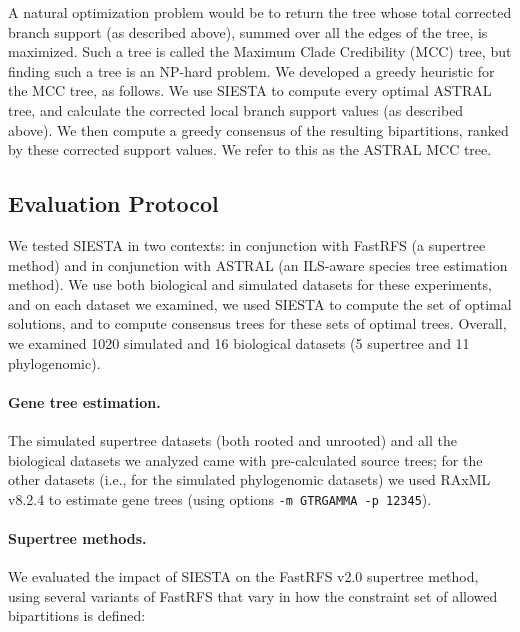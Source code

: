 A natural optimization problem would be to return the tree whose total  corrected branch support (as described above), summed over all the edges of the tree,  is maximized. 
Such a tree is called the Maximum Clade Credibility (MCC) tree, but 
finding such a tree is an NP-hard problem.
We developed a greedy heuristic for the MCC tree, as follows.
We use SIESTA to compute every optimal ASTRAL tree, and calculate the corrected local branch support values (as described above). 
We then compute a greedy consensus of the resulting bipartitions, ranked by these corrected support values. 
We refer to this as the ASTRAL MCC tree.



\subsection{Evaluation Protocol}

We tested SIESTA  in two 
contexts: in conjunction with FastRFS (a supertree
method) 
and in
conjunction with ASTRAL (an ILS-aware
species tree estimation method).
We use both biological and simulated datasets for these
experiments, and on each dataset we examined, we used SIESTA to compute the set of optimal solutions, and to compute consensus trees for these sets of optimal trees.
Overall, we examined 1020 simulated  and  16 biological datasets (5 supertree and 11 phylogenomic).




\paragraph{Gene tree estimation. }
The  simulated supertree  datasets (both rooted and unrooted) and all the biological datasets  we analyzed came with pre-calculated source trees; for the other datasets (i.e., for the simulated phylogenomic datasets)
we used RAxML v8.2.4 \cite{Stamatakis2014} to estimate gene trees (using options \texttt{-m GTRGAMMA -p 12345}).

\paragraph{Supertree methods. }
We evaluated the impact of SIESTA on the FastRFS v2.0 supertree method, using several variants of FastRFS that vary in how the constraint set of allowed bipartitions is defined:

